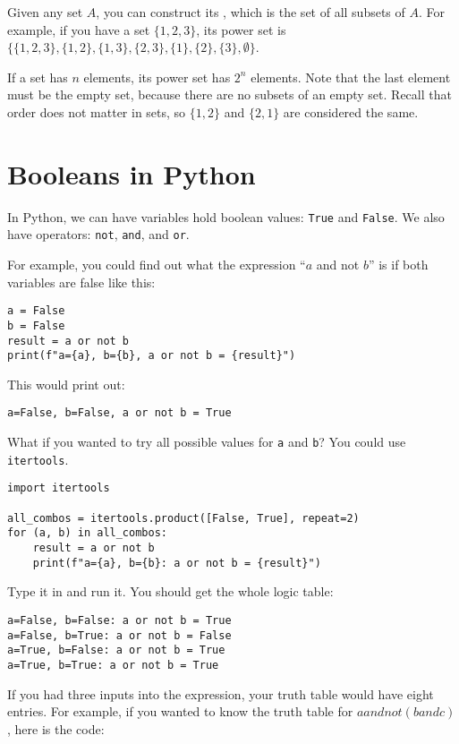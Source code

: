 Given any set $A$, you can construct its , which is
the set of all subsets of $A$.  For example, if you have a set
$\{1,2,3\}$, its power set is $\{\{1,2,3\}, \{1,2\},\{1,3\}, \{2,3\},
\{1\}, \{2\}, \{3\}, \emptyset\}$.

If a set has $n$ elements, its power set has $2^n$ elements. Note that the last element must be the empty set, because there are no subsets of an empty set. Recall that order does not matter in sets, so $\{1,2\}$ and $\{2,1\}$ are considered the same.

\section{Booleans in Python}

In Python, we can have variables hold boolean values: \texttt{True}
and \texttt{False}.  We also have operators: \texttt{not},
\texttt{and}, and \texttt{or}.

For example, you could find out what the expression ``$a$ and not
$b$'' is if both variables are false like this:
\begin{verbatim}
a = False
b = False
result = a or not b
print(f"a={a}, b={b}, a or not b = {result}")
\end{verbatim}

This would print out:
\begin{verbatim}
a=False, b=False, a or not b = True
\end{verbatim}

What if you wanted to try all possible values for \texttt{a} and
\texttt{b}? You could use \texttt{itertools}.

\begin{verbatim}
import itertools

all_combos = itertools.product([False, True], repeat=2)
for (a, b) in all_combos:
    result = a or not b
    print(f"a={a}, b={b}: a or not b = {result}")       
\end{verbatim}

Type it in and run it. You should get the whole logic table:

\begin{verbatim}
a=False, b=False: a or not b = True
a=False, b=True: a or not b = False
a=True, b=False: a or not b = True
a=True, b=True: a or not b = True
\end{verbatim}

If you had three inputs into the expression, your truth table would
have eight entries.  For example, if you wanted to know the truth
table for $a and not(b and c)$, here is the code:

